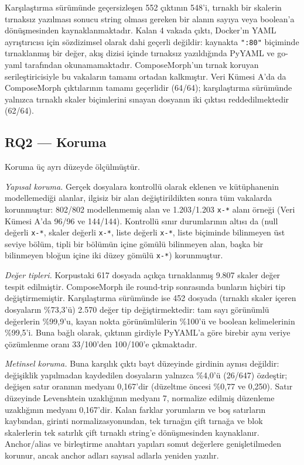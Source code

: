 \documentclass[12pt,a4paper]{article}
\begin{document}
Karşılaştırma sürümünde geçersizleşen 552 çıktının 548'i, tırnaklı bir skalerin
tırnaksız yazılması sonucu string olması gereken bir alanın sayıya veya
boolean'a dönüşmesinden kaynaklanmaktadır. Kalan 4 vakada çıktı,
Docker'ın YAML ayrıştırıcısı için sözdizimsel olarak dahi geçerli
değildir: kaynakta \texttt{":80"} biçiminde tırnaklanmış bir değer, akış
dizisi içinde tırnaksız yazıldığında PyYAML ve go-yaml tarafından
okunamamaktadır. ComposeMorph'un tırnak koruyan serileştiricisiyle bu
vakaların tamamı ortadan kalkmıştır. Veri Kümesi A'da da ComposeMorph
çıktılarının tamamı geçerlidir (64/64); karşılaştırma sürümünde yalnızca tırnaklı
skaler biçimlerini sınayan dosyanın iki çıktısı reddedilmektedir (62/64).

\subsection{RQ2 --- Koruma}
Koruma üç ayrı düzeyde ölçülmüştür.

\emph{Yapısal koruma.} Gerçek dosyalara kontrollü olarak eklenen ve
kütüphanenin modellemediği alanlar, ilgisiz bir alan değiştirildikten
sonra tüm vakalarda korunmuştur: 802/802 modellenmemiş alan ve
1.203/1.203 \texttt{x-*} alanı örneği (Veri Kümesi A'da 96/96 ve
144/144). Kontrollü sınır durumlarının altısı da (null değerli
\texttt{x-*}, skaler değerli \texttt{x-*}, liste değerli \texttt{x-*},
liste biçiminde bilinmeyen üst seviye bölüm, tipli bir bölümün içine
gömülü bilinmeyen alan, başka bir bilinmeyen bloğun içine iki düzey
gömülü \texttt{x-*}) korunmuştur.

\emph{Değer tipleri.} Korpustaki 617 dosyada açıkça tırnaklanmış 9.807
skaler değer tespit edilmiştir. ComposeMorph ile round-trip sonrasında
bunların hiçbiri tip değiştirmemiştir. Karşılaştırma sürümünde ise 452 dosyada
(tırnaklı skaler içeren dosyaların \%73,3'ü) 2.570 değer tip
değiştirmektedir: tam sayı görünümlü değerlerin \%99,9'u, kayan nokta
görünümlülerin \%100'ü ve boolean kelimelerinin \%99,5'i. Buna bağlı
olarak, çıktının girdiyle PyYAML'a göre birebir aynı veriye çözümlenme
oranı 33/100'den 100/100'e çıkmaktadır.

\emph{Metinsel koruma.} Buna karşılık çıktı bayt düzeyinde girdinin aynısı
değildir: değişiklik yapılmadan kaydedilen dosyaların yalnızca \%4,0'ü
(26/647) özdeştir; değişen satır oranının medyanı 0,167'dir (düzeltme
öncesi \%0,77 ve 0,250). Satır düzeyinde Levenshtein uzaklığının medyanı
7, normalize edilmiş düzenleme uzaklığının medyanı 0,167'dir. Kalan farklar
yorumların ve boş satırların kaybından, girinti normalizasyonundan, tek
tırnağın çift tırnağa ve blok skalerlerin tek satırlık çift tırnaklı
string'e dönüşmesinden kaynaklanır. Anchor/alias ve birleştirme anahtarı yapıları
somut değerlere genişletilmeden korunur, ancak anchor adları sayısal
adlarla yeniden yazılır.
\end{document}
